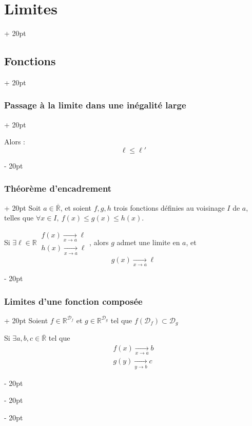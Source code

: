 \documentclass[a4paper, 12pt, twoside]{article}
\newcommand{\R}{\mathbb{R}} %
\newcommand{\cj}[1]{\overline{#1}} %
\newcommand{\tendsto}[1]{\xrightarrow[#1]{}}
\renewcommand{\le}{\leqslant}
\newcommand{\ind}[1][20pt]{\advance\leftskip + #1}
\newcommand{\deind}[1][20pt]{\advance\leftskip - #1}
\newenvironment{indt}[2][20pt]{#2 \par \ind[#1]}{\par \deind} %
\begin{document}
\begin{indt}{\section{Limites}}
\begin{indt}{\subsection{Fonctions}}
\begin{indt}{\subsubsection{Passage à la limite dans une inégalité large}}
                \vspace{6pt}
                
                Alors :
                \[
                    \ell \le \ell'
                \]
            \end{indt}

            \vspace{12pt}
            
            \begin{indt}{\subsubsection{Théorème d'encadrement}}
                Soit $a \in \cj \R$, et soient $f, g, h$ trois fonctions définies au voisinage $I$ de $a$, telles que $\forall x \in I,\ f(x) \le g(x) \le h(x)$.

                \vspace{6pt}
                
                Si
                $
                    \exists \ell \in \R\
                    \begin{array}{|l}
                        f(x) \tendsto{x \to a} \ell
                        \\
                        h(x) \tendsto{x \to a} \ell
                    \end{array}
                $, alors $g$ admet une limite en $a$, et
                \[
                    g(x) \tendsto{x \to a} \ell
                \]
            \end{indt}

            \vspace{6pt}
            
            \begin{indt}{\subsubsection{Limites d'une fonction composée}}
                Soient $f \in \R^{\mathcal D_f}$ et $g \in \R^{\mathcal D_g}$ tel que $f(\mathcal D_f) \subset \mathcal D_g$

                Si $\exists a, b, c \in \cj \R$ tel que
                \[
                    \begin{array}{|l}
                        f(x) \tendsto{x \to a} b
                        \\
                        g(y) \tendsto{y \to b} c
                    \end{array}
                \]


\end{indt}
\end{indt}
\end{indt}
\end{document}
